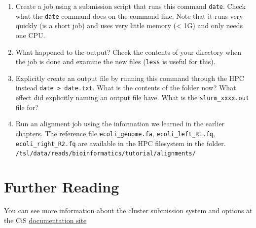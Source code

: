 \documentclass[]{book}
\providecommand{\tightlist}{%
  \setlength{\itemsep}{0pt}\setlength{\parskip}{0pt}}
\begin{document}
\begin{enumerate}
\def\labelenumi{\arabic{enumi}.}
\tightlist
\item
  Create a job using a submission script that runs this command \texttt{date}. Check what the \texttt{date} command does on the command line. Note that it runs very quickly (is a short job) and uses very little memory (\textless{} 1G) and only needs one CPU.
\item
  What happened to the output? Check the contents of your directory when the job is done and examine the new files (\texttt{less} is useful for this).
\item
  Explicitly create an output file by running this command through the HPC instead \texttt{date\ \textgreater{}\ date.txt}. What is the contents of the folder now? What effect did explicitly naming an output file have. What is the \texttt{slurm\_xxxx.out} file for?
\item
  Run an alignment job using the information we learned in the earlier chapters. The reference file \texttt{ecoli\_genome.fa}, \texttt{ecoli\_left\_R1.fq}, \texttt{ecoli\_right\_R2.fq} are available in the HPC filesystem in the folder. \texttt{/tsl/data/reads/bioinformatics/tutorial/alignments/}
\end{enumerate}

\hypertarget{further-reading-4}{%
\section{Further Reading}\label{further-reading-4}}

You can see more information about the cluster submission system and options at the CiS \href{https://docs.cis.nbi.ac.uk/display/CIS/Run+a+simple+job+on+the+cluster}{documentation site}


\end{document}
